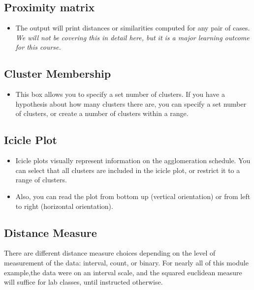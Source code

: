 \documentclass[a4paper,12pt]{article}
\begin{document}
\subsection{Proximity matrix}
\begin{itemize}
	\item The output will print distances or similarities computed for any pair of cases. \textit{We will not be covering this in detail here, but it is a major learning outcome for this course.}
\end{itemize}

\subsection{Cluster Membership}
\begin{itemize}
	\item This box allows you to specify a set number of clusters. If you have a
	hypothesis about how many clusters there are, you can specify a set number of clusters, or
	create a number of clusters within a range.
\end{itemize}


\subsection{Icicle Plot} 
\begin{itemize}
	\item Icicle plots visually represent information on the agglomeration
	schedule. You can select that all clusters are included in the icicle plot, or restrict it to a range of
	clusters. 
	\item Also, you can read the plot from bottom up (vertical orientation) or from left to right
	(horizontal orientation).
\end{itemize}
\subsection{Distance Measure} There are different distance measure choices depending on the level of measurement
of the data: interval, count, or binary.
For nearly all of this module example,the data were on an interval scale, and the squared euclidean measure will suffice for lab classes, until instructed otherwise.
\end{document}

